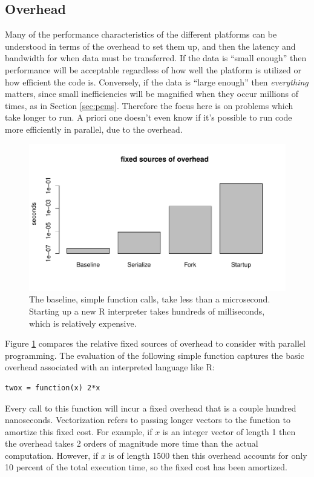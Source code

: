 \documentclass[12pt]{article}
\begin{document}
\subsection{Overhead}

Many of the performance characteristics of the different platforms can be
understood in terms of the overhead to set them up, and then the latency
and bandwidth for when data must be transferred.  If the data is ``small
enough'' then performance will be acceptable regardless of how well the
platform is utilized or how efficient the code is. Conversely, if the data
is ``large enough'' then \emph{everything} matters, since small
inefficiencies will be magnified when they occur millions of times, as in
Section \ref{sec:pems}.  Therefore the focus here is on problems which take longer
to run. A priori one doesn't even know if it's possible to run code more
efficiently in parallel, due to the overhead.

\begin{figure}
\centering
\includegraphics[width=.8\linewidth]{compute_times/overhead}
\caption{The baseline, simple function calls, take less than a microsecond. Starting up a
    new R interpreter takes hundreds of milliseconds, which is relatively expensive.}
\label{fig:overhead}
\end{figure}

Figure \ref{fig:overhead} compares the relative fixed sources of overhead to
consider with parallel programming. The evaluation of the following simple
function captures the basic overhead associated with an interpreted
language like R:
\begin{verbatim}
twox = function(x) 2*x
\end{verbatim}
Every call to this function will incur a fixed overhead that is a couple
hundred nanoseconds. Vectorization refers to passing longer vectors to the
function to amortize this fixed cost. For example, if $x$ is an integer
vector of length 1 then the overhead takes 2 orders of magnitude more time
than the actual computation. However, if $x$ is of length 1500 then this
overhead accounts for only 10 percent of the total execution time, so the
fixed cost has been amortized.
\end{document}
